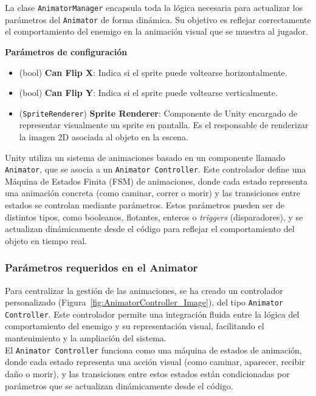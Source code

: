 La clase \texttt{AnimatorManager} encapsula toda la lógica necesaria para actualizar los parámetros del \texttt{Animator} de forma dinámica. Su objetivo es reflejar correctamente el comportamiento del enemigo en la animación visual que se muestra al jugador.

\textbf{Parámetros de configuración}
\begin{itemize}
	\item (bool) \textbf{Can Flip X}: Indica si el sprite puede voltearse horizontalmente.
	\item (bool) \textbf{Can Flip Y}: Indica si el sprite puede voltearse verticalmente. 
	\item (\texttt{SpriteRenderer}) \textbf{Sprite Renderer}: Componente de Unity encargado de representar visualmente un sprite en pantalla. Es el responsable de renderizar la imagen 2D asociada al objeto en la escena.

\end{itemize}

Unity utiliza un sistema de animaciones basado en un componente llamado \texttt{Animator}, que se asocia a un \texttt{Animator Controller}. Este controlador define una Máquina de Estados Finita (FSM) de animaciones, donde cada estado representa una animación concreta (como caminar, correr o morir) y las transiciones entre estados se controlan mediante parámetros. Estos parámetros pueden ser de distintos tipos, como booleanos, flotantes, enteros o \textit{triggers} (disparadores), y se actualizan dinámicamente desde el código para reflejar el comportamiento del objeto en tiempo real.\\

\subsubsection{Parámetros requeridos en el Animator}

Para centralizar la gestión de las animaciones, se ha creado un controlador personalizado (Figura~\ref{fig:AnimatorController_Image}), del tipo \texttt{Animator Controller}. Este controlador permite una integración fluida entre la lógica del comportamiento del enemigo y su representación visual, facilitando el mantenimiento y la ampliación del sistema.\\

El \texttt{Animator Controller} funciona como una máquina de estados de animación, donde cada estado representa una acción visual (como caminar, aparecer, recibir daño o morir), y las transiciones entre estos estados están condicionadas por parámetros que se actualizan dinámicamente desde el código.\\


